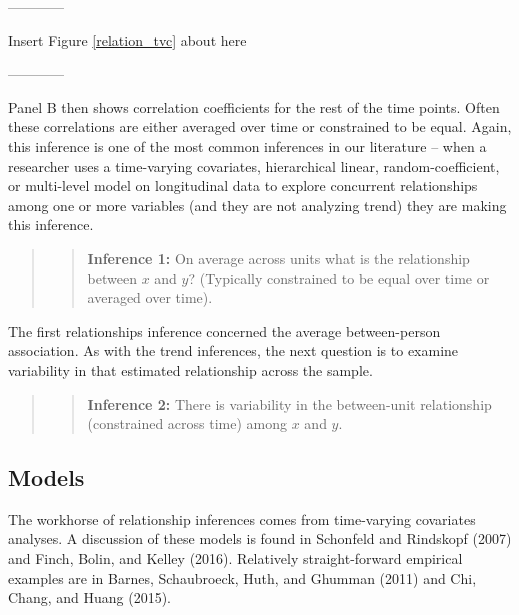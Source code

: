 \documentclass[english,,man]{apa6}
\theoremstyle{definition}
\theoremstyle{definition}
\theoremstyle{definition}
\theoremstyle{remark}
\begin{document}
\begin{center}

------------

Insert Figure \ref{relation_tvc} about here

------------

\end{center}

Panel B then shows correlation coefficients for the rest of the time
points. Often these correlations are either averaged over time or
constrained to be equal. Again, this inference is one of the most common
inferences in our literature -- when a researcher uses a time-varying
covariates, hierarchical linear, random-coefficient, or multi-level
model on longitudinal data to explore concurrent relationships among one
or more variables (and they are not analyzing trend) they are making
this inference.

\begin{quote}
\begin{quote}
\textbf{Inference 1:} On average across units what is the relationship
between \(x\) and \(y\)? (Typically constrained to be equal over time or
averaged over time).
\end{quote}
\end{quote}

The first relationships inference concerned the average between-person
association. As with the trend inferences, the next question is to
examine variability in that estimated relationship across the sample.

\begin{quote}
\begin{quote}
\textbf{Inference 2:} There is variability in the between-unit
relationship (constrained across time) among \(x\) and \(y\).
\end{quote}
\end{quote}

\hypertarget{models-1}{%
\subsection{Models}\label{models-1}}

The workhorse of relationship inferences comes from time-varying
covariates analyses. A discussion of these models is found in Schonfeld
and Rindskopf (2007) and Finch, Bolin, and Kelley (2016). Relatively
straight-forward empirical examples are in Barnes, Schaubroeck, Huth,
and Ghumman (2011) and Chi, Chang, and Huang (2015).
\end{document}
